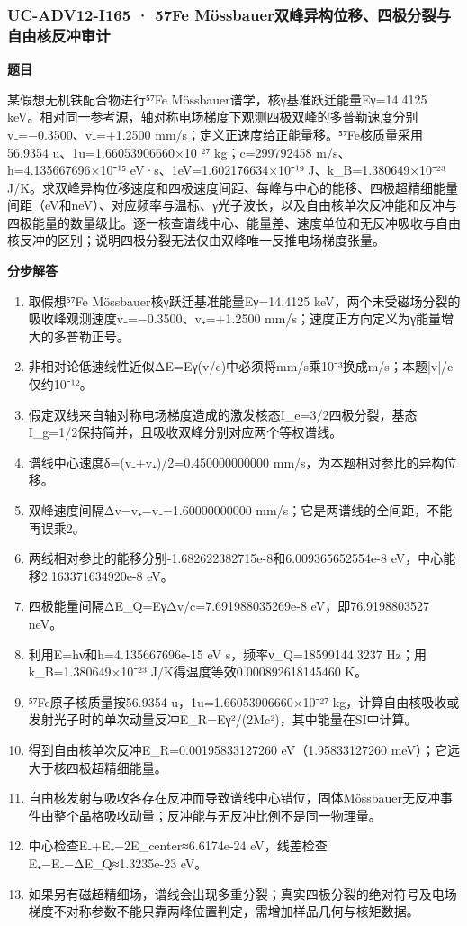 \documentclass[UTF8,11pt,a4paper]{ctexart}
\begin{document}
\subsubsection*{UC-ADV12-I165 · 57Fe Mössbauer双峰异构位移、四极分裂与自由核反冲审计}
\noindent\textbf{题目}\par
某假想无机铁配合物进行⁵⁷Fe Mössbauer谱学，核γ基准跃迁能量Eγ=14.4125 keV。相对同一参考源，轴对称电场梯度下观测四极双峰的多普勒速度分别v₋=−0.3500、v₊=+1.2500 mm/s；定义正速度给正能量移。⁵⁷Fe核质量采用56.9354 u、1u=1.66053906660×10⁻²⁷ kg；c=299792458 m/s、h=4.135667696×10⁻¹⁵ eV·s、1eV=1.602176634×10⁻¹⁹ J、k\_B=1.380649×10⁻²³ J/K。求双峰异构位移速度和四极速度间距、每峰与中心的能移、四极超精细能量间距（eV和neV）、对应频率与温标、γ光子波长，以及自由核单次反冲能和反冲与四极能量的数量级比。逐一核查谱线中心、能量差、速度单位和无反冲吸收与自由核反冲的区别；说明四极分裂无法仅由双峰唯一反推电场梯度张量。\par
\medskip\noindent\textbf{分步解答}
\begin{enumerate}
\item 取假想⁵⁷Fe Mössbauer核γ跃迁基准能量Eγ=14.4125 keV，两个未受磁场分裂的吸收峰观测速度v₋=−0.3500、v₊=+1.2500 mm/s；速度正方向定义为γ能量增大的多普勒正号。
\item 非相对论低速线性近似ΔE=Eγ(v/c)中必须将mm/s乘10⁻³换成m/s；本题|v|/c仅约10⁻¹²。
\item 假定双线来自轴对称电场梯度造成的激发核态I\_e=3/2四极分裂，基态I\_g=1/2保持简并，且吸收双峰分别对应两个等权谱线。
\item 谱线中心速度δ=(v₋+v₊)/2=0.450000000000 mm/s，为本题相对参比的异构位移。
\item 双峰速度间隔Δv=v₊−v₋=1.60000000000 mm/s；它是两谱线的全间距，不能再误乘2。
\item 两线相对参比的能移分别-1.682622382715e-8和6.009365652554e-8 eV，中心能移2.163371634920e-8 eV。
\item 四极能量间隔ΔE\_Q=EγΔv/c=7.691988035269e-8 eV，即76.9198803527 neV。
\item 利用E=hν和h=4.135667696e-15 eV s，频率ν\_Q=18599144.3237 Hz；用k\_B=1.380649×10⁻²³ J/K得温度等效0.000892618145460 K。
\item ⁵⁷Fe原子核质量按56.9354 u，1u=1.66053906660×10⁻²⁷ kg，计算自由核吸收或发射光子时的单次动量反冲E\_R=Eγ²/(2Mc²)，其中能量在SI中计算。
\item 得到自由核单次反冲E\_R=0.00195833127260 eV（1.95833127260 meV）；它远大于核四极超精细能量。
\item 自由核发射与吸收各存在反冲而导致谱线中心错位，固体Mössbauer无反冲事件由整个晶格吸收动量；反冲能与无反冲比例不是同一物理量。
\item 中心检查E₋+E₊−2E\_center≈6.6174e-24 eV，线差检查E₊−E₋−ΔE\_Q≈1.3235e-23 eV。
\item 如果另有磁超精细场，谱线会出现多重分裂；真实四极分裂的绝对符号及电场梯度不对称参数不能只靠两峰位置判定，需增加样品几何与核矩数据。
\end{enumerate}
\end{document}
